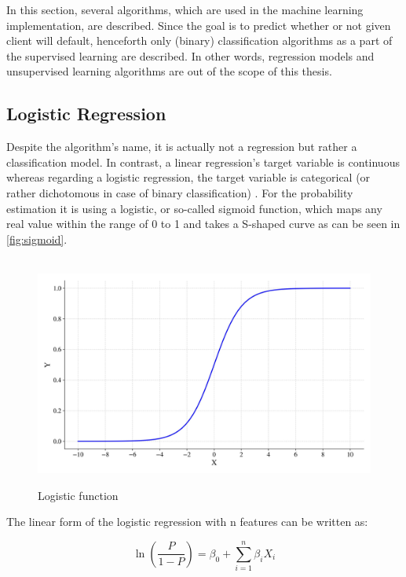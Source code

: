 In this section, several algorithms, which are used in the machine learning implementation, are described. Since the goal is to predict whether or not given client will default, henceforth only (binary) classification algorithms as a part of the supervised learning are described. In other words, regression models and unsupervised learning algorithms are out of the scope of this thesis.
\subsection{Logistic Regression}
\label{subsubsec:logisticregression}
Despite the algorithm's name, it is actually not a regression but rather a classification model.
In contrast, a linear regression's target variable is continuous whereas regarding a logistic regression, the target variable is categorical (or rather dichotomous in case of binary classification) \citep{wendler2021data}.
For the probability estimation it is using a logistic, or so-called sigmoid function, which maps any real value within the range of 0 to 1 and takes a S-shaped curve as can be seen in \autoref{fig:sigmoid}.

\begin{figure}[H]
    \centering
    \caption{Logistic function}\vspace{0.5em}
    \label{fig:sigmoid}\
    \includegraphics[width=130mm]{Figures/sigmoid.jpg}
    \vspace{-1em}
\end{figure}

The linear form of the logistic regression with n features can be written as:

\begin{equation}\label{eq}
    \ln\left(\frac{P}{1-P}\right) = \beta_0  + \sum_{i=1}^{n} \beta_i X_i
\end{equation}

